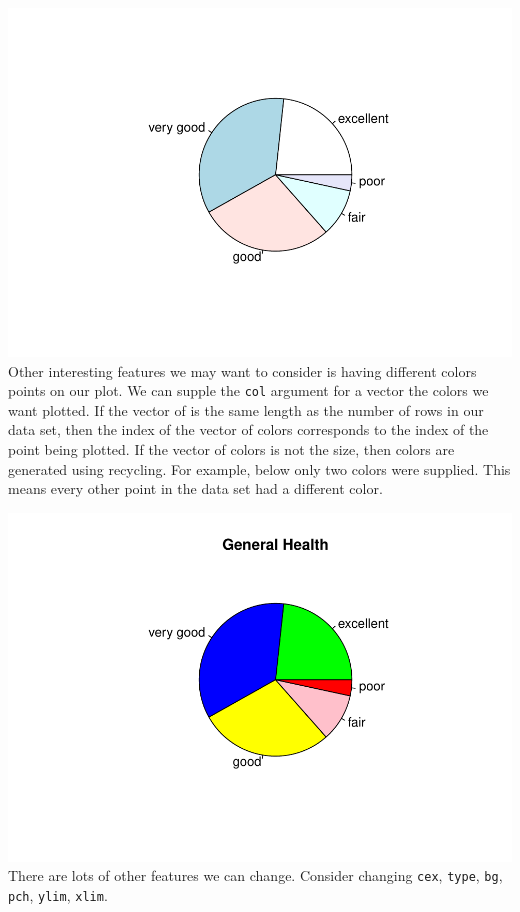 \documentclass[
]{book}
\newenvironment{Shaded}{\begin{snugshade}}{\end{snugshade}}
\newcommand{\CommentTok}[1]{\textcolor[rgb]{0.56,0.35,0.01}{\textit{#1}}}
\newcommand{\DataTypeTok}[1]{\textcolor[rgb]{0.13,0.29,0.53}{#1}}
\newcommand{\KeywordTok}[1]{\textcolor[rgb]{0.13,0.29,0.53}{\textbf{#1}}}
\newcommand{\NormalTok}[1]{#1}
\newcommand{\OperatorTok}[1]{\textcolor[rgb]{0.81,0.36,0.00}{\textbf{#1}}}
\newcommand{\StringTok}[1]{\textcolor[rgb]{0.31,0.60,0.02}{#1}}
\begin{document}
\includegraphics{_main_files/figure-latex/unnamed-chunk-137-1.pdf}
Other interesting features we may want to consider is having different colors points on our plot. We can supple the \texttt{col} argument for a vector the colors we want plotted. If the vector of is the same length as the number of rows in our data set, then the index of the vector of colors corresponds to the index of the point being plotted. If the vector of colors is not the size, then colors are generated using recycling. For example, below only two colors were supplied. This means every other point in the data set had a different color.

\begin{Shaded}
\end{Shaded}

\includegraphics{_main_files/figure-latex/unnamed-chunk-138-1.pdf}
There are lots of other features we can change. Consider changing \texttt{cex}, \texttt{type}, \texttt{bg}, \texttt{pch}, \texttt{ylim}, \texttt{xlim}.
\end{document}

